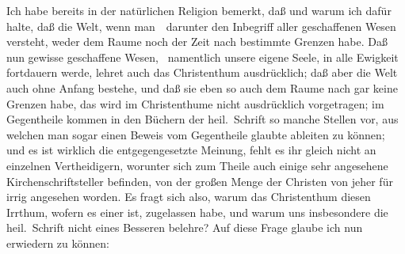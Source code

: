Ich habe bereits in der natürlichen Religion bemerkt, daß und warum ich dafür halte, daß die Welt, wenn man~\ darunter den Inbegriff aller geschaffenen Wesen versteht, weder dem Raume noch der Zeit nach bestimmte Grenzen habe. Daß nun gewisse geschaffene Wesen, \zB\ namentlich unsere eigene Seele, in alle Ewigkeit fortdauern werde, lehret auch das Christenthum ausdrücklich; daß aber die Welt auch ohne Anfang bestehe, und daß sie eben so auch dem Raume nach gar keine Grenzen habe, das wird im Christenthume nicht ausdrücklich vorgetragen; im Gegentheile kommen in den Büchern der heil.\ Schrift so manche Stellen vor, aus welchen man sogar einen Beweis vom Gegentheile glaubte ableiten zu können; und es ist wirklich die entgegengesetzte Meinung, fehlt es ihr gleich nicht an einzelnen Vertheidigern, worunter sich zum Theile auch einige sehr angesehene Kirchenschriftsteller befinden, von der großen Menge der Christen von jeher für irrig angesehen worden. Es fragt sich also, warum das Christenthum diesen Irrthum, wofern es einer ist, zugelassen habe, und warum uns insbesondere die heil.\ Schrift nicht eines Besseren belehre? Auf diese Frage glaube ich nun erwiedern zu können:
